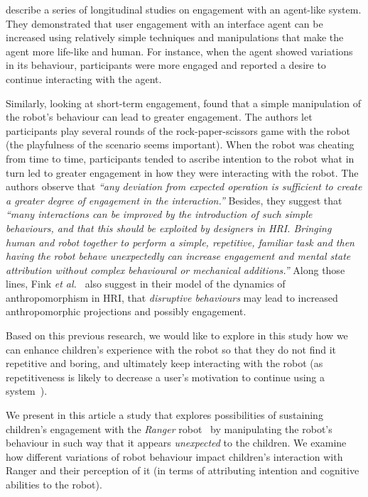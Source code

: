 \documentclass{sig-alternate}
\newcommand{\etal}{{\textit{et al.~}}}
\begin{document}
\cite{bickmore_maintaining_2010} describe a series of longitudinal studies on
engagement with an agent-like system. They demonstrated that user engagement
with an interface agent can be increased using relatively simple techniques and
manipulations that make the agent more life-like and human. For instance, when
the agent showed variations in its behaviour, participants were more engaged and
reported a desire to continue interacting with the agent.

Similarly, looking at short-term engagement, \cite{short_no_2010} found that a
simple manipulation of the robot's behaviour can lead to greater engagement. The
authors let participants play several rounds of the rock-paper-scissors game
with the robot (the playfulness of the scenario seems important). When the robot
was cheating from time to time, participants tended to ascribe intention to the
robot what in turn led to greater engagement in how they were interacting with
the robot. The authors observe that \textit{``any deviation from expected
operation is sufficient to create a greater degree of engagement in the
interaction.''} Besides, they suggest that \textit{``many interactions can be
improved by the introduction of such simple behaviours, and that this should
be exploited by designers in HRI. Bringing human and robot together to
perform a simple, repetitive, familiar task and then having the robot behave
unexpectedly can increase engagement and mental state attribution without
complex behavioural or mechanical additions.''}  Along those lines, Fink
\etal\cite{fink2014dynamics} also suggest in their model of the dynamics of
anthropomorphism in HRI, that \emph{disruptive behaviours} may lead to increased
anthropomorphic projections and possibly engagement.

Based on this previous research, we would like to explore in this study how
we can enhance children's experience with the robot so that they do not find it
repetitive and boring, and ultimately keep interacting with the robot (as
repetitiveness is likely to decrease a user's motivation to continue using a
system~\cite{bickmore_establishing_2005}).

We present in this article a study that explores possibilities of sustaining
children's engagement with the \emph{Ranger} robot~\cite{mondada2014ranger} by
manipulating the robot's behaviour in such way that it appears
\textit{unexpected} to the children. We examine how different variations of
robot behaviour impact children's interaction with Ranger and their perception of
it (in terms of attributing intention and cognitive abilities to the robot).
\end{document}
